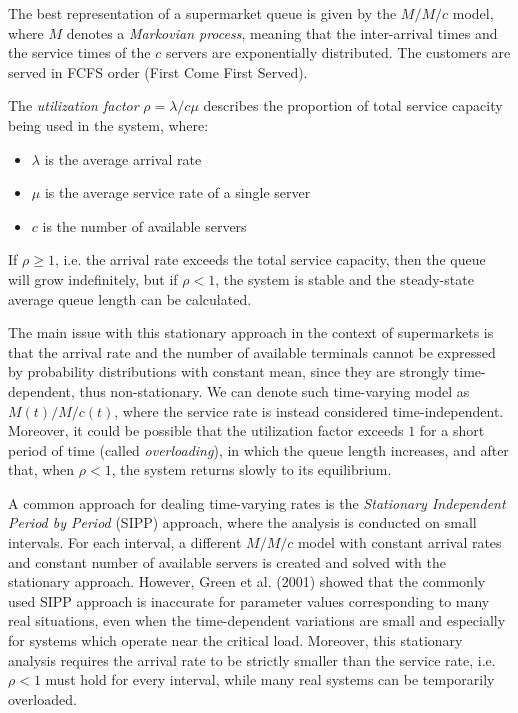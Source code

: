 The best representation of a supermarket queue is given by the \( M/M/c \) model, where \( M \) denotes a \emph{Markovian process}, meaning that the inter-arrival times and the service times of the \( c \) servers are exponentially distributed. The customers are served in FCFS order (First Come First Served).

The \emph{utilization factor} \( \rho = \lambda/c\mu \) describes the proportion of total service capacity being used in the system, where:
\begin{itemize}
  \item \( \lambda \) is the average arrival rate
  \item \( \mu \) is the average service rate of a single server
  \item \( c \) is the number of available servers
\end{itemize}
If \( \rho \ge 1 \), i.e. the arrival rate exceeds the total service capacity, then the queue will grow indefinitely, but if \( \rho < 1 \), the system is stable and the steady-state average queue length can be calculated.

The main issue with this stationary approach in the context of supermarkets is that the arrival rate and the number of available terminals cannot be expressed by probability distributions with constant mean, since they are strongly time-dependent, thus non-stationary. We can denote such time-varying model as \( M(t)/M/c(t) \), where the service rate is instead considered time-independent. Moreover, it could be possible that the utilization factor exceeds \( 1 \) for a short period of time (called \emph{overloading}), in which the queue length increases, and after that, when \( \rho < 1 \), the system returns slowly to its equilibrium.

A common approach for dealing time-varying rates is the \emph{Stationary Independent Period by Period} (SIPP) approach, where the analysis is conducted on small intervals. For each interval, a different \( M/M/c \) model with constant arrival rates and constant number of available servers is created and solved with the stationary approach. However, Green et al. (2001) \cite{green2001} showed that the commonly used SIPP approach is inaccurate for parameter values corresponding to many real situations, even when the time-dependent variations are small and especially for systems which operate near the critical load. Moreover, this stationary analysis requires the arrival rate to be strictly smaller than the service rate, i.e. \( \rho < 1 \) must hold for every interval, while many real systems can be temporarily overloaded.

\clearpage